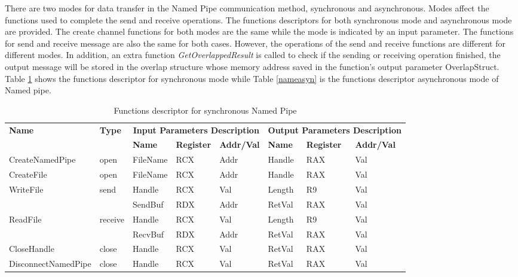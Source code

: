 There are two modes for data transfer in the Named Pipe communication method, synchronous and asynchronous. Modes affect the functions used to complete the send and receive operations. The functions descriptors for both synchronous mode and asynchronous mode are provided. The create channel functions for both modes are the same while the mode is indicated by an input parameter. The functions for send and receive message are also the same for both cases. However, the operations of the send and receive functions are different for different modes. In addition, an extra function \textit{GetOverlappedResult} is called to check if the sending or receiving operation finished, the output message will be stored in the overlap structure whose memory address saved in the function's output parameter OverlapStruct. Table \ref{namesyn} shows the functions descriptor for synchronous mode while Table \ref{nameasyn} is the functions descriptor asynchronous mode of Named pipe.

\begin{table}[H]
  \centering
  \caption{Functions descriptor for synchronous Named Pipe}
  \label{namesyn}
  \begin{tabular}{|l|l|l|l|l|l|l|l|}
\hline
             \multirow{2}{*}{{\textbf{Name}}} & \multirow{2}{*}{{\textbf{Type}}} & \multicolumn{3}{c|}{\textbf{Input Parameters Description}} & \multicolumn{3}{c|}{\textbf{Output Parameters Description}} \\
              \cline{3-8} 
             & & \textbf{Name}& \textbf{Register} & \textbf{Addr/Val} & \textbf{Name}& \textbf{Register} &  \textbf{Addr/Val}  \\
             \hline
      CreateNamedPipe
       &open & FileName & RCX  & Addr &  Handle & RAX & Val\\
      \hline         
      CreateFile
       &open & FileName & RCX & Addr&  Handle & RAX & Val\\ 
      \hline              
      \multirow{2}{*}{WriteFile}
       &\multirow{2}{*}{send} &  Handle & RCX & Val & Length & R9 &Val\\
        \cline{3-8} 
       & & SendBuf & RDX & Addr & RetVal& RAX & Val\\
      \hline            
      \multirow{2}{*}{ReadFile}
       &\multirow{2}{*}{receive} &  Handle & RCX & Val& Length &R9 & Val\\
        \cline{3-8} 
       & & RecvBuf & RDX  & Addr & RetVal& RAX & Val\\
      \hline            
      CloseHandle &
       close &  Handle & RCX & Val & RetVal& RAX & Val\\
      \hline            
      DisconnectNamedPipe &
      close &  Handle & RCX & Val & RetVal& RAX & Val\\
      \hline               
  \end{tabular}
\end{table}


